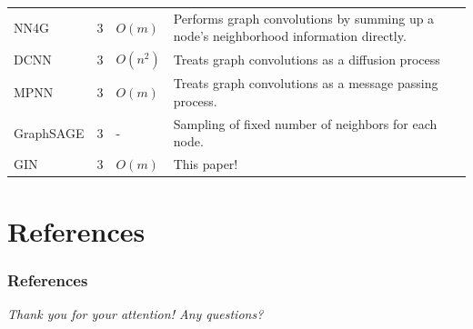 \documentclass{beamer}
\begin{document}
\begin{frame}
{\begin{tabular}{|llll|}
\rowcolor{lightgray}
NN4G\cite{Micheli2009} & $3$ & $O(m)$ & Performs graph convolutions by summing up a node's neighborhood information directly.\\

DCNN\cite{Atwood2016} & $3$ & $O(n^2)$ & Treats graph convolutions as a diffusion process\\

\rowcolor{lightgray}
MPNN\cite{Gilmer2017} & $3$ & $O(m)$ & Treats graph convolutions as a message passing process.\\

GraphSAGE\cite{Hamilton2017} & $3$ & - & Sampling of fixed number of neighbors for each node.\\

\rowcolor{lightgray}
\alert{GIN}\cite{Xu2019} & $3$ & $O(m)$ & This paper!\\

\bottomrule
\end{tabular}
}

\end{frame}


\section{References}


\begin{frame}[allowframebreaks]
\frametitle{References}
\nocite{*}
\printbibliography
\end{frame}


\begin{frame}{}
  \centering \Large
  \emph{Thank you for your attention! Any questions?}
\end{frame}

\end{document}
